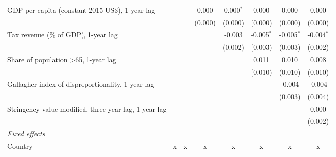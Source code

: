 \begin{tabular}{lccccccc}
   GDP per capita (constant 2015 US\$), 1-year lag                                         &                &               & 0.000         & 0.000$^{*}$   & 0.000        & 0.000        & 0.000\\   
                                                                                           &                &               & (0.000)       & (0.000)       & (0.000)      & (0.000)      & (0.000)\\   
   Tax revenue (\% of GDP), 1-year lag                                                     &                &               &               & -0.003        & -0.005$^{*}$ & -0.005$^{*}$ & -0.004$^{*}$\\   
                                                                                           &                &               &               & (0.002)       & (0.003)      & (0.003)      & (0.002)\\   
   Share of population >65, 1-year lag                                                     &                &               &               &               & 0.011        & 0.010        & 0.008\\   
                                                                                           &                &               &               &               & (0.010)      & (0.010)      & (0.010)\\   
   Gallagher index of disproportionality, 1-year lag                                       &                &               &               &               &              & -0.004       & -0.004\\   
                                                                                           &                &               &               &               &              & (0.003)      & (0.004)\\   
   Stringency value modified, three-year lag, 1-year lag                                   &                &               &               &               &              &              & 0.000\\   
                                                                                           &                &               &               &               &              &              & (0.002)\\   
   \emph{Fixed effects}\\
   Country                                                                                 & x              & x             & x             & x             & x            & x            & x\\  

\end{tabular}
